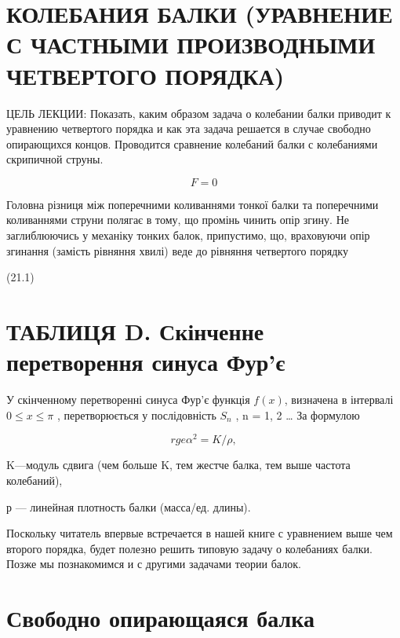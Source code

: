 \documentclass[
  ukrainian,
]{article}
\begin{document}
\section{КОЛЕБАНИЯ БАЛКИ (УРАВНЕНИЕ С ЧАСТНЫМИ ПРОИЗВОДНЫМИ ЧЕТВЕРТОГО
ПОРЯДКА)}\label{ux43aux43eux43bux435ux431ux430ux43dux438ux44f-ux431ux430ux43bux43aux438-ux443ux440ux430ux432ux43dux435ux43dux438ux435-ux441-ux447ux430ux441ux442ux43dux44bux43cux438-ux43fux440ux43eux438ux437ux432ux43eux434ux43dux44bux43cux438-ux447ux435ux442ux432ux435ux440ux442ux43eux433ux43e-ux43fux43eux440ux44fux434ux43aux430}

ЦЕЛЬ ЛЕКЦИИ: Показать, каким образом задача о колебании балки приводит к
уравнению четвертого порядка и как эта задача решается в случае свободно
опирающихся концов. Проводится сравнение колебаний балки с колебаниями
скрипичной струны.

\[
F = 0
\]

Головна різниця між поперечними коливаннями тонкої балки та поперечними
коливаннями струни полягає в тому, що промінь чинить опір згину. Не
заглиблюючись у механіку тонких балок, припустимо, що, враховуючи опір
згинання (замість рівняння хвилі) веде до рівняння четвертого порядку

(21.1)

\section{ТАБЛИЦЯ D. Скінченне перетворення синуса
Фур'є}\label{ux442ux430ux431ux43bux438ux446ux44f-d.-ux441ux43aux456ux43dux447ux435ux43dux43dux435-ux43fux435ux440ux435ux442ux432ux43eux440ux435ux43dux43dux44f-ux441ux438ux43dux443ux441ux430-ux444ux443ux440ux454}

У скінченному перетворенні синуса Фур'є функція \(f(x)\), визначена в
інтервалі \(0 \le x \le \pi\) , перетворюється у послідовність \(S_n\) ,
n = 1, 2 \ldots{} За формулою

\[
rge  \alpha^2 = K/\rho  ,
\]

K---модуль сдвига (чем больше K, тем жестче балка, тем выше частота
колебаний),

р --- линейная плотность балки (масса/ед. длины).

Поскольку читатель впервые встречается в нашей книге с уравнением выше
чем второго порядка, будет полезно решить типовую задачу о колебаниях
балки. Позже мы познакомимся и с другими задачами теории балок.

\section{Свободно опирающаяся
балка}\label{ux441ux432ux43eux431ux43eux434ux43dux43e-ux43eux43fux438ux440ux430ux44eux449ux430ux44fux441ux44f-ux431ux430ux43bux43aux430}
\end{document}

